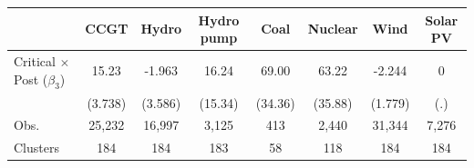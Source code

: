\begin{tabular}{l c c c c c c c}
\toprule
 & CCGT & Hydro & Hydro pump & Coal & Nuclear & Wind & Solar PV \\
\midrule

Critical $\times$ Post ($\beta_3$)&       15.23\sym{***}&      -1.963         &       16.24         &       69.00\sym{*}  &       63.22         &      -2.244         &           0         \\
                    &     (3.738)         &     (3.586)         &     (15.34)         &     (34.36)         &     (35.88)         &     (1.779)         &         (.)         \\
\midrule
Obs.                &      25,232         &      16,997         &       3,125         &         413         &       2,440         &      31,344         &       7,276         \\
Clusters            &         184         &         184         &         183         &          58         &         118         &         184         &         184         \\
\bottomrule
\end{tabular}
